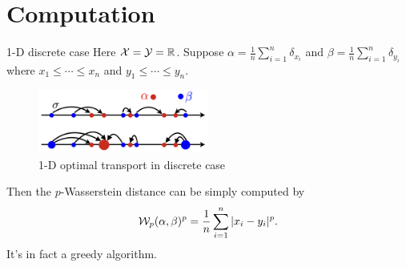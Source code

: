 \section{Computation}

\begin{frame}{1-D discrete case}
    \footnotesize
    Here $\mathcal{X}=\mathcal{Y}=\mathbb{R}$. Suppose
     $\alpha=\frac{1}{n}\sum_{i=1}^n \delta_{x_i}$
    and $\beta=\frac{1}{n}\sum_{i=1}^n \delta_{y_i}$
    where $x_1\leq \cdots \leq x_n$ and $y_1\leq \cdots \leq y_n$.

    \begin{figure}
        \centering
        \captionsetup{font=scriptsize}
        \includegraphics[width=0.5\textwidth]{png/1d-discrete.png}
        \caption{1-D optimal transport in discrete case}
    \end{figure}
    
    Then the $p$-Wasserstein distance can be simply computed by
    \begin{equation}
        \mathcal{W}_p(\alpha,\beta)^p = \frac{1}{n}\sum_{i=1}^n |x_i-y_i|^p.
    \end{equation}
    It's in fact a greedy algorithm.
\end{frame}